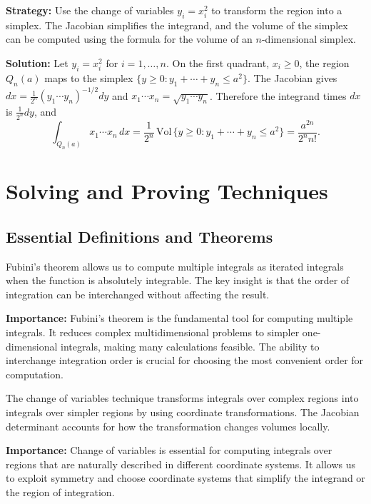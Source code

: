 \noindent\textbf{Strategy:} Use the change of variables \(y_i = x_i^2\) to transform the region into a simplex. The Jacobian simplifies the integrand, and the volume of the simplex can be computed using the formula for the volume of an \(n\)-dimensional simplex.

\bigskip\noindent\textbf{Solution:}
Let \(y_i=x_i^2\) for \(i=1,\ldots,n\). On the first quadrant, \(x_i\ge 0\), the region \(Q_n(a)\) maps to the simplex \(\{y\ge 0: y_1+\cdots+y_n\le a^2\}\). The Jacobian gives \(dx=\frac{1}{2^n}(y_1\cdots y_n)^{-1/2}dy\) and \(x_1\cdots x_n=\sqrt{y_1\cdots y_n}\). Therefore the integrand times \(dx\) is \(\frac{1}{2^n} dy\), and
\[
\int_{Q_n(a)} x_1\cdots x_n\,dx = \frac{1}{2^n}\,\mathrm{Vol}\,\{y\ge 0: y_1+\cdots+y_n\le a^2\} = \frac{a^{2n}}{2^n n!}.
\]

\section{Solving and Proving Techniques}

\subsection*{Essential Definitions and Theorems}

\begin{definition}
Fubini's theorem allows us to compute multiple integrals as iterated integrals when the function is absolutely integrable. The key insight is that the order of integration can be interchanged without affecting the result.
\end{definition}

\noindent\textbf{Importance:} Fubini's theorem is the fundamental tool for computing multiple integrals. It reduces complex multidimensional problems to simpler one-dimensional integrals, making many calculations feasible. The ability to interchange integration order is crucial for choosing the most convenient order for computation.



\begin{definition}
The change of variables technique transforms integrals over complex regions into integrals over simpler regions by using coordinate transformations. The Jacobian determinant accounts for how the transformation changes volumes locally.
\end{definition}

\noindent\textbf{Importance:} Change of variables is essential for computing integrals over regions that are naturally described in different coordinate systems. It allows us to exploit symmetry and choose coordinate systems that simplify the integrand or the region of integration.



